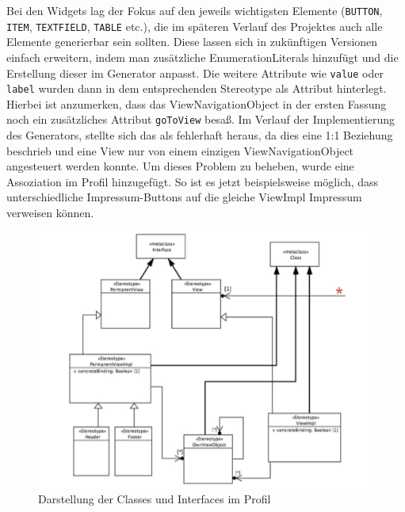 Bei den Widgets lag der Fokus auf den jeweils wichtigsten Elemente (\texttt{BUTTON},  \texttt{ITEM},  \texttt{TEXTFIELD},  \texttt{TABLE} etc.), die im späteren Verlauf des Projektes auch alle Elemente generierbar sein sollten. Diese lassen sich in zukünftigen Versionen einfach erweitern, indem man zusätzliche EnumerationLiterals hinzufügt und die Erstellung dieser im Generator anpasst. Die weitere Attribute wie \texttt{value} oder \texttt{label} wurden dann in dem entsprechenden Stereotype als Attribut hinterlegt.
Hierbei ist anzumerken, dass das ViewNavigationObject in der ersten Fassung noch ein zusätzliches Attribut \texttt{goToView} besaß. Im Verlauf der Implementierung des Generators, stellte sich das als fehlerhaft heraus, da dies eine 1:1 Beziehung beschrieb und eine View nur von einem einzigen ViewNavigationObject angesteuert werden konnte. Um dieses Problem zu beheben, wurde eine Assoziation im Profil hinzugefügt. So ist es jetzt beispielsweise möglich, dass unterschiedliche Impressum-Buttons auf die gleiche ViewImpl Impressum verweisen können. \\
\begin{figure}[htbp]
\begin{center}
\includegraphics[width=\textwidth]{./img/ProfilClass.pdf}
\caption{Darstellung der Classes und Interfaces im Profil}\label{Fig:UMLProfilClass}
\end{center}
\end{figure}\\

